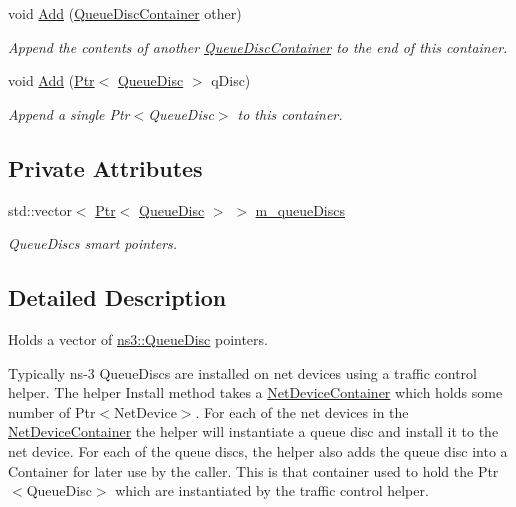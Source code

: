 \begin{DoxyCompactItemize}
void \hyperlink{classns3_1_1QueueDiscContainer_a0520ac277a87beaeda5608dd8bfd37a4}{Add} (\hyperlink{classns3_1_1QueueDiscContainer}{Queue\+Disc\+Container} other)
\begin{DoxyCompactList}\small\item\em Append the contents of another \hyperlink{classns3_1_1QueueDiscContainer}{Queue\+Disc\+Container} to the end of this container. \end{DoxyCompactList}\item 
void \hyperlink{classns3_1_1QueueDiscContainer_afc3ee503f476ea697faed2dd05b70cb4}{Add} (\hyperlink{classns3_1_1Ptr}{Ptr}$<$ \hyperlink{classns3_1_1QueueDisc}{Queue\+Disc} $>$ q\+Disc)
\begin{DoxyCompactList}\small\item\em Append a single Ptr$<$\+Queue\+Disc$>$ to this container. \end{DoxyCompactList}\end{DoxyCompactItemize}
\subsection*{Private Attributes}
\begin{DoxyCompactItemize}
\item 
std\+::vector$<$ \hyperlink{classns3_1_1Ptr}{Ptr}$<$ \hyperlink{classns3_1_1QueueDisc}{Queue\+Disc} $>$ $>$ \hyperlink{classns3_1_1QueueDiscContainer_a1518c7ab608bf21b84b21474131ffed5}{m\+\_\+queue\+Discs}
\begin{DoxyCompactList}\small\item\em Queue\+Discs smart pointers. \end{DoxyCompactList}\end{DoxyCompactItemize}


\subsection{Detailed Description}
Holds a vector of \hyperlink{classns3_1_1QueueDisc}{ns3\+::\+Queue\+Disc} pointers. 

Typically ns-\/3 Queue\+Discs are installed on net devices using a traffic control helper. The helper Install method takes a \hyperlink{classns3_1_1NetDeviceContainer}{Net\+Device\+Container} which holds some number of Ptr$<$\+Net\+Device$>$. For each of the net devices in the \hyperlink{classns3_1_1NetDeviceContainer}{Net\+Device\+Container} the helper will instantiate a queue disc and install it to the net device. For each of the queue discs, the helper also adds the queue disc into a Container for later use by the caller. This is that container used to hold the Ptr$<$\+Queue\+Disc$>$ which are instantiated by the traffic control helper. 


